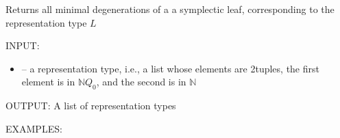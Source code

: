 \documentclass[letterpaper,10pt,english]{sphinxmanual}
\begin{document}

\begin{fulllineitems}
\label{\detokenize{index:quivercombinatorics.quivercombinatorics.Quiver.minimal_degenerations}}
\pysigstartsignatures
\pysiglinewithargsret
{}
{}
{}
\pysigstopsignatures
\sphinxAtStartPar
Returns all minimal degenerations of a a symplectic leaf, corresponding to the representation type \(L\)

\sphinxAtStartPar
INPUT:
\begin{itemize}
\item {} 
\sphinxAtStartPar
{} – a representation type, i.e., a list whose elements are 2\sphinxhyphen{}tuples, the first element is in \(\mathbb{N}Q_0\), and the second is in \(\mathbb{N}\)

\end{itemize}

\sphinxAtStartPar
OUTPUT: A list of representation types

\sphinxAtStartPar
EXAMPLES:


\end{fulllineitems}
\end{document}
